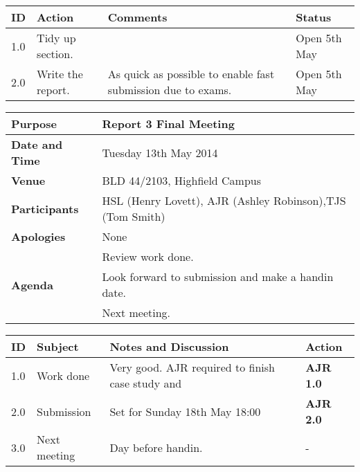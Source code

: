 \begin{center}
\begin{longtable}{| p{} | >{\raggedright\arraybackslash}p{} |  p{} | >{\raggedright\arraybackslash}p{}|} \hline
\textbf{ID} & \textbf{Action} & \textbf{Comments} & \textbf{Status} \\ \hline
\endhead
1.0	&	Tidy up section.	&		& Open 5th May \\ \hline
2.0	&   Write the report.	&	As quick as possible to enable fast submission due to exams.&	Open 5th May \\ \hline
\end{longtable}
\end{center}








\begin{center}
\begin{longtable}{| m{} | m{} |} \hline
\textbf{Purpose} & Report 3 Final Meeting \\ \hline
\textbf{Date and Time} & Tuesday 13th May 2014 \\ \hline
\textbf{Venue} & BLD 44/2103, Highfield Campus \\ \hline
\textbf{Participants} & HSL (Henry Lovett), AJR (Ashley Robinson),TJS (Tom Smith)\\ \hline
\textbf{Apologies} & None \\ \hline
\multirow{3}{*}{\textbf{Agenda}} & Review work done. \\ 
  & Look forward to submission and make a handin date. \\
  & Next meeting.\\  \hline
\end{longtable}
\end{center}

\begin{center}
\begin{longtable}{| p{} |>{\raggedright\arraybackslash}p{} | p{} |>{\raggedright\arraybackslash}p{}|} \hline
\textbf{ID} & \textbf{Subject} & \textbf{Notes and Discussion} & \textbf{Action} \\ \hline
\endhead
1.0	&	Work done	&	Very good. AJR required to finish case study and &   \textbf{AJR 1.0}	 \\ \hline
2.0 & Submission  & Set for Sunday 18th May 18:00 &  \textbf{AJR 2.0} \\ \hline
3.0 & Next meeting &  Day before handin. & - \\ \hline

\end{longtable}
\end{center}

